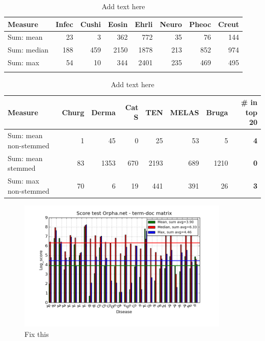 \begin{table}[H]
  \begin{tiny}
  \caption{Add text here}
  \label{testResult}
  \begin{tabular}{|l|r|r|r|r|r|r|r|}
    \hline
    Measure &Infec&Cushi&Eosin&Ehrli&Neuro&Pheoc&Creut \\
    \hline
    Sum: mean &23&3&362&772&35&76&144 \\
    \hline
    Sum: median &188&459&2150&1878&213&852&974 \\
    \hline
    Sum: max &54&10&344&2401&235&469&495  \\
    \hline
  \multicolumn{8}{c}{} \\
  \end{tabular}
  \begin{tabular}{|l|r|r|r|r|r|r|r|}
    \hline
    Measure &Churg&Derma&Cat S&TEN&MELAS&Bruga& \scriptsize{\textbf{\# in top 20}} \\
    \hline
    Sum: mean non-stemmed &1&45&0&25&53&5& \scriptsize{\textbf{4}} \\
    \hline
    Sum: mean stemmed &83&1353&670&2193&689&1210 &  \scriptsize{\textbf{0}}\\
    \hline
    Sum: max non-stemmed &70&6&19&441&391&26 & \scriptsize{\textbf{3}} \\
    \hline
  \end{tabular}
  \end{tiny}
\end{table}

\begin{figure}[H]
        \begin{center}
          \includegraphics[width=0.9\textwidth]{barcharts/termDoc_orphan_hist_3000_ns_mea_med_max_sum.png}
        \end{center}
        \caption{Fix this}
        \label{termDoc_orphan_hist_3000_ns_mea_med_max_sum}
\end{figure}

